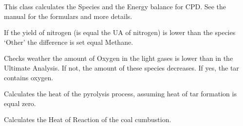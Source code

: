 \documentclass[letterpaper,10pt,english]{sphinxmanual}
\begin{document}
\begin{fulllineitems}
\label{CPDClasses:Compos_and_Energy.CPD_SpeciesBalance}
This class calculates the Species and the Energy balance for CPD. See the manual for the formulars and more details.

\begin{fulllineitems}
\label{CPDClasses:Compos_and_Energy.CPD_SpeciesBalance._CPD_SpeciesBalance__CheckOthers}
If the yield of nitrogen (is equal the UA of nitrogen) is lower than the species `Other' the difference is set equal Methane.

\end{fulllineitems}


\begin{fulllineitems}
\label{CPDClasses:Compos_and_Energy.CPD_SpeciesBalance._CPD_SpeciesBalance__CheckOxygen}
Checks weather the amount of Oxygen in the light gases is lower than in the Ultimate Analysis. If not, the amount of these species decreases. If yes, the tar contains oxygen.

\end{fulllineitems}


\begin{fulllineitems}
\label{CPDClasses:Compos_and_Energy.CPD_SpeciesBalance._CPD_SpeciesBalance__QPyro}
Calculates the heat of the pyrolysis process, assuming heat of tar formation is equal zero.

\end{fulllineitems}


\begin{fulllineitems}
\label{CPDClasses:Compos_and_Energy.CPD_SpeciesBalance._CPD_SpeciesBalance__Q_React}
Calculates the Heat of Reaction of the coal cumbustion.


\end{fulllineitems}
\end{fulllineitems}
\end{document}
